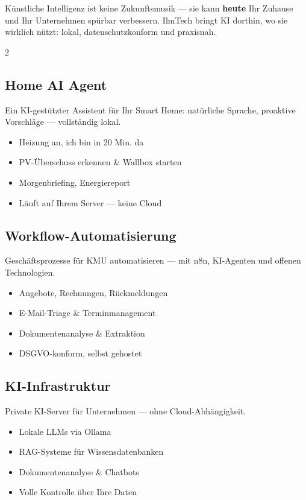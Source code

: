 \documentclass[
  fontsize=10pt,
  parskip=half,
]{scrartcl}
\begin{document}
Künstliche Intelligenz ist keine Zukunftsmusik — sie kann \textbf{heute} Ihr
Zuhause und Ihr Unternehmen spürbar verbessern. IlmTech bringt KI dorthin,
wo sie wirklich nützt: lokal, datenschutzkonform und praxisnah.

\begin{multicols}{2}

\subsection*{\textcolor{ilm-blue}{\faBrain}\; Home AI Agent}
Ein KI-gestützter Assistent für Ihr Smart Home: natürliche
Sprache, proaktive Vorschläge — vollständig lokal.
\begin{itemize}
  \item \glqq Heizung an, ich bin in 20 Min. da\grqq
  \item PV-Überschuss erkennen \& Wallbox starten
  \item Morgenbriefing, Energiereport
  \item Läuft auf Ihrem Server — keine Cloud
\end{itemize}

\subsection*{\textcolor{ilm-orange}{\faCogs}\; Workflow-Automatisierung}
Geschäftsprozesse für KMU automatisieren — mit n8n,
KI-Agenten und offenen Technologien.
\begin{itemize}
  \item Angebote, Rechnungen, Rückmeldungen
  \item E-Mail-Triage \& Terminmanagement
  \item Dokumentenanalyse \& Extraktion
  \item DSGVO-konform, selbst gehostet
\end{itemize}

\columnbreak

\subsection*{\textcolor{ilm-purple}{\faServer}\; KI-Infrastruktur}
Private KI-Server für Unternehmen — ohne Cloud-Abhängigkeit.
\begin{itemize}
  \item Lokale LLMs via Ollama
  \item RAG-Systeme für Wissensdatenbanken
  \item Dokumentenanalyse \& Chatbots
  \item Volle Kontrolle über Ihre Daten
\end{itemize}


\end{multicols}
\end{document}
